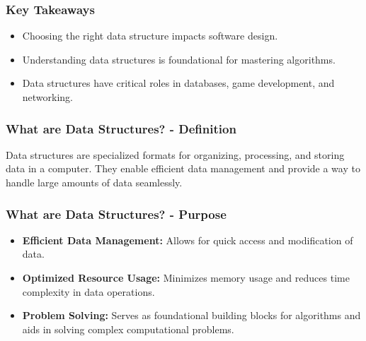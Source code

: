 \documentclass{beamer}
\begin{document}
\begin{frame}[fragile]
    \frametitle{Key Takeaways}
    \begin{itemize}
        \item Choosing the right data structure impacts software design.
        \item Understanding data structures is foundational for mastering algorithms.
        \item Data structures have critical roles in databases, game development, and networking.
    \end{itemize}
\end{frame}

\begin{frame}[fragile]
    \frametitle{What are Data Structures? - Definition}
    Data structures are specialized formats for organizing, processing, and storing data in a computer. 
    They enable efficient data management and provide a way to handle large amounts of data seamlessly.
\end{frame}

\begin{frame}[fragile]
    \frametitle{What are Data Structures? - Purpose}
    \begin{itemize}
        \item \textbf{Efficient Data Management:} Allows for quick access and modification of data.
        \item \textbf{Optimized Resource Usage:} Minimizes memory usage and reduces time complexity in data operations.
        \item \textbf{Problem Solving:} Serves as foundational building blocks for algorithms and aids in solving complex computational problems.
    \end{itemize}
\end{frame}
\end{document}
